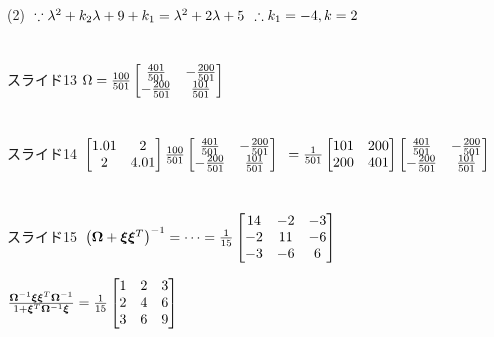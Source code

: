 \documentclass[12pt,a4paper]{article}
\begin{document}
\\
\\
(2)
$\\\because \lambda^2+k_2\lambda+9+k_1=\lambda^2+2\lambda+5$
$\\\therefore k_1=-4, k=2$
\\
\\
\\
スライド13
$\\\Omega=\frac{100}{501}
\begin{bmatrix}
\frac{401}{501} & -\frac{200}{501}\\
-\frac{200}{501} & \frac{101}{501}
\end{bmatrix}$
\\
\\
\\
スライド14
$\\\begin{bmatrix}
1.01 & 2\\
2 & 4.01
\end{bmatrix}
\frac{100}{501}
\begin{bmatrix}
\frac{401}{501} & -\frac{200}{501}\\
-\frac{200}{501} & \frac{101}{501}
\end{bmatrix}$
$\\=\frac{1}{501}
\begin{bmatrix}
101 & 200\\
200 & 401
\end{bmatrix}
\begin{bmatrix}
\frac{401}{501} & -\frac{200}{501}\\
-\frac{200}{501} & \frac{101}{501}
\end{bmatrix}$
\\
\\
\\
スライド15
$\\\left(\bm{\Omega}+\bm{\xi\xi}^T\right)^{-1}=\cdots=\frac{1}{15}
\begin{bmatrix}
14 & -2 & -3\\
-2 & 11 & -6\\
-3 & -6 & 6\\
\end{bmatrix}$

$\\\frac{\bm{\Omega}^{-1}\bm{\xi\xi}^T\bm{\Omega}^{-1}}{1+\bm{\xi}^T\bm{\Omega}^{-1}\bm{\xi}}=\frac{1}{15}
\begin{bmatrix}
1 & 2 & 3\\
2 & 4 & 6\\
3 & 6 & 9
\end{bmatrix}$
\end{document}
